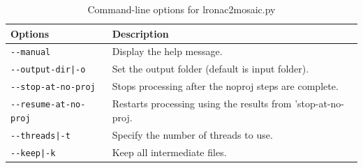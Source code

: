 \medskip

\begin{longtable}{|l|p{10cm}|}
\caption{Command-line options for lronac2mosaic.py}
\label{tbl:lronac2mosaic}
\endfirsthead
\endhead
\endfoot
\endlastfoot
\hline
Options & Description \\ \hline \hline
\texttt{-\/-manual} & Display the help message.\\ \hline
\texttt{-\/-output-dir|-o} & Set the output folder (default is input folder).\\ \hline
\texttt{-\/-stop-at-no-proj} & Stops processing after the noproj steps are complete. \\ \hline
\texttt{-\/-resume-at-no-proj} & Restarts processing using the results from 'stop-at-no-proj. \\ \hline
\texttt{-\/-threads|-t} & Specify the number of threads to use.\\ \hline
\texttt{-\/-keep|-k} & Keep all intermediate files.\\ \hline
\end{longtable}



         






